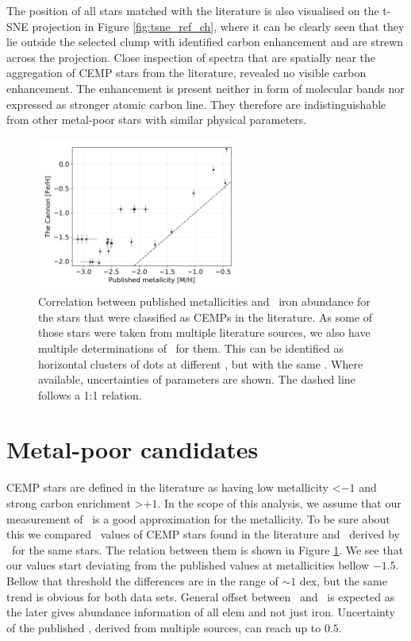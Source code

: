 The position of all stars matched with the literature is also visualised on the \mbox{t-SNE} projection in Figure \ref{fig:tsne_ref_ch}, where it can be clearly seen that they lie outside the selected clump with identified carbon enhancement and are strewn across the projection. Close inspection of spectra that are spatially near the aggregation of CEMP stars from the literature, revealed no visible carbon enhancement. The enhancement is present neither in form of molecular bands nor expressed as stronger atomic carbon line. They therefore are indistinguishable from other metal-poor stars with similar physical parameters.

\begin{figure}
	\centering
	\includegraphics[width=0.6\textwidth]{cemps_meh_feh.png}
	\caption{Correlation between published metallicities and \TC\ iron abundance for the stars that were classified as CEMPs in the literature. As some of those stars were taken from multiple literature sources, we also have multiple determinations of \Meh\ for them. This can be identified as horizontal clusters of dots at different \Meh, but with the same \Feh. Where available, uncertainties of parameters are shown. The dashed line follows a 1:1 relation.}
	\label{fig:cemps_feh}
\end{figure}

\section{Metal-poor candidates}
\label{sec:cemp_cemp}
CEMP stars are defined in the literature as having low metallicity \Meh \textless $-1$ and strong carbon enrichment \Cfe \textgreater $+1$. In the scope of this analysis, we assume that our measurement of \Feh\ is a good approximation for the metallicity. To be sure about this we compared \Meh\ values of CEMP stars found in the literature and \Feh\ derived by \TC\ for the same stars. The relation between them is shown in Figure \ref{fig:cemps_feh}. We see that our values start deviating from the published values at metallicities bellow $-1.5$. Bellow that threshold the differences are in the range of $\sim1$ dex, but the same trend is obvious for both data sets. General offset between \Feh\ and \Meh\ is expected as the later gives abundance information of all elem and not just iron. Uncertainty of the published \Meh, derived from multiple sources, can reach up to $0.5$. 

